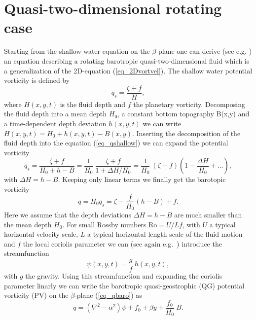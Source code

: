 \section{Quasi-two-dimensional rotating case} \label{sec_quasi2Dcase}
%
Starting from the shallow water equation on the $\beta$-plane one can
derive (see e.g. \cite{danilovandgurarie2000}) an equation
describing a rotating barotropic quasi-two-dimensional fluid which is a
generalization of the 2D-equation (\ref{eq_2Dvortvel}). The shallow
water potential vorticity is defined by 
\begin{equation} \label{eq_qshallow}
  q_{s} = \frac{\zeta + f}{H},
\end{equation}
where $H(x,y,t)$ is the fluid depth and $f$ the planetary vorticity. 
Decomposing the fluid depth into a mean depth $H_{0}$, a constant 
bottom topography B(x,y) and a time-dependent
depth deviation $h(x,y,t)$ we can write $H(x,y,t) = H_{0} + h(x,y,t) - B(x,y)$. 
Inserting the decomposition of the fluid depth into the equation 
(\ref{eq_qshallow}) we can expand the potential vorticity
\begin{equation} \label{eq_qshallowdecomp}
  q_{s} 
   =
  \frac{\zeta + f}{H_{0} + h - B}
   =
  \frac{1}{H_{0}} \ \frac{\zeta + f}{1 + \Delta H / H_{0}}
   =
  \frac{1}{H_{0}} \ 
  \left( \zeta + f \right) \left(1 - \frac{\Delta H}{H_{0}} + \dots \right),
\end{equation}
with $\Delta H = h - B$. Keeping only linear terms we finally get the barotopic
vorticity
\begin{equation} \label{eq_qbaro}
  q = H_{0} q_{s} = \zeta - \frac{f}{H_{0}} \left(h - B\right) + f.
\end{equation}
Here we assume that the depth deviations $\Delta H = h - B$ are much smaller
than the mean depth $H_{0}$. For small Rossby numbers $\mathrm{Ro} = U/Lf$, 
with $U$ a typical horizontal velocity scale, $L$ a typical horizontal 
length scale of the fluid motion and $f$ the local coriolis parameter 
we can (see again e.g.\ \cite{danilovandgurarie2000}) introduce 
the streamfunction 
\begin{equation} \label{eq_psibaro}
  \psi(x,y,t) = \frac{g}{f} \ h(x,y,t),    
\end{equation}
with $g$ the gravity. Using this streamfunction and expanding the 
coriolis parameter linarly we can write the barotropic 
quasi-geostrophic (QG) potential vorticity (PV) 
on the $\beta$-plane (\ref{eq_qbaro}) as 
\begin{equation} \label{eq_qdef}
  q = \left( \nabla^{2}- \alpha^{2} \right) \psi 
   + f_{0} + \beta y + \frac{f_{0}}{H_{0}} \ B.
\end{equation}

